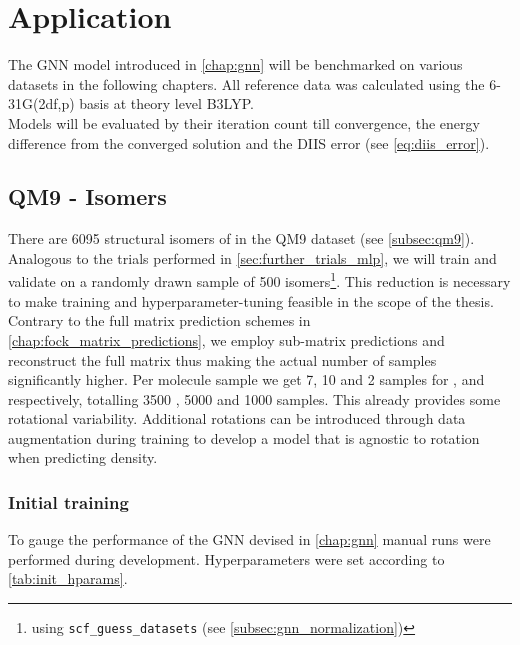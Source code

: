 \chapter{Application}
\label{chap:application}
The GNN model introduced in \autoref{chap:gnn} will be benchmarked on various datasets in the following chapters. All reference data was calculated using the 6-31G(2df,p) basis at theory level B3LYP. \\

Models will be evaluated by their iteration count till convergence, the energy difference from the converged solution and the DIIS error (see \autoref{eq:diis_error}). 

\section{QM9 -  Isomers}
\label{sec:qm9_isomers_benchmark}
There are 6095 structural isomers of  in the QM9 dataset (see \autoref{subsec:qm9}). Analogous to the trials performed in \autoref{sec:further_trials_mlp}, we will train and validate on a randomly drawn sample of 500 isomers\footnote{using \texttt{scf\_guess\_datasets} (see \autoref{subsec:gnn_normalization})}. This reduction is necessary to make training and hyperparameter-tuning feasible in the scope of the thesis. Contrary to the full matrix prediction schemes in \autoref{chap:fock_matrix_predictions}, we employ sub-matrix predictions and reconstruct the full matrix thus making the actual number of samples significantly higher. Per molecule sample we get 7, 10 and 2 samples for ,  and  respectively, totalling 3500 , 5000  and 1000  samples. This already provides some rotational variability. Additional rotations can be introduced through data augmentation during training to develop a model that is agnostic to rotation when predicting density.\\

\subsection{Initial training}
\label{subsec:qm9_isomers_initial}
To gauge the performance of the GNN devised in \autoref{chap:gnn} manual runs were performed during development. Hyperparameters were set according to \autoref{tab:init_hparams}. 

